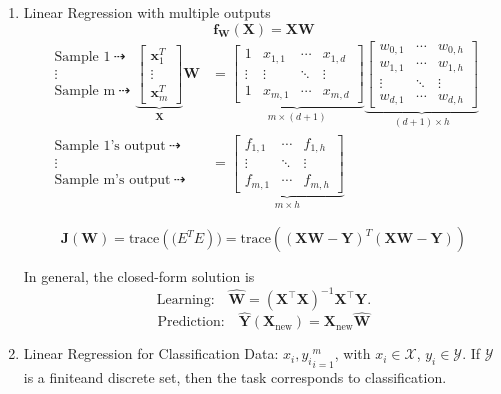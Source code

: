 \documentclass[
]{ctexart}
\begin{document}
\begin{enumerate}
  data. GD: \(O(Tmd)\), works well when d is large.
\item
  Linear Regression with multiple outputs
  \[\mathbf{f_W(X)} = \mathbf{XW}\] \[
  \begin{aligned}
  \begin{matrix}
  \text{Sample 1} \ \dashrightarrow \\
  \vdots \\
  \text{Sample m} \ \dashrightarrow
  \end{matrix}
  \underbrace{\begin{bmatrix}
  \mathbf{x}_1^T \\
  \vdots \\
  \mathbf{x}_m^T
  \end{bmatrix}}_{\mathbf{X}} \mathbf{W} 
  &= \underbrace{\begin{bmatrix}
  1 & x_{1,1} & \cdots & x_{1,d} \\
  \vdots & \vdots & \ddots & \vdots \\
  1 & x_{m,1} & \cdots & x_{m,d}
  \end{bmatrix}}_{m \times (d+1)}
  \underbrace{\begin{bmatrix}
  w_{0,1} & \cdots & w_{0,h} \\
  w_{1,1} & \cdots & w_{1,h} \\
  \vdots & \ddots & \vdots \\
  w_{d,1} & \cdots & w_{d,h}
  \end{bmatrix}}_{(d+1) \times h} \\
  \begin{matrix}
  \text{Sample 1's output} \ \dashrightarrow \\
  \vdots \\
  \text{Sample m's output} \ \dashrightarrow
  \end{matrix}
  &= \underbrace{\begin{bmatrix}
  f_{1,1} & \cdots & f_{1,h} \\
  \vdots & \ddots & \vdots \\
  f_{m,1} & \cdots & f_{m,h}
  \end{bmatrix}}_{m \times h}
  \end{aligned}
  \]

  \[\mathbf{J(W)} = \text{trace}(\mathbf(E^T E)) = \text{trace}((\mathbf{XW} - \mathbf{Y})^T(\mathbf{XW} - \mathbf{Y}))\]

  In general, the closed-form solution is
  \[\text{Learning:} \quad \hat{\mathbf{W}} = (\mathbf{X}^\top \mathbf{X})^{-1} \mathbf{X}^\top \mathbf{Y}.\]
  \[\text{Prediction:} \quad \hat{\mathbf{Y}}(\mathbf{X}_{\text{new}}) = \mathbf{X}_{\text{new}}\hat{\mathbf{W}}\]
\item
  Linear Regression for Classification Data: \({x_i,y_i}_{i=1}^m\), with
  \(x_i \in \mathcal{X}\), \(y_i \in \mathcal{Y}\). If \(\mathcal{Y}\)
  is a finiteand discrete set, then the task corresponds to
  classification.


\end{enumerate}
\end{document}
